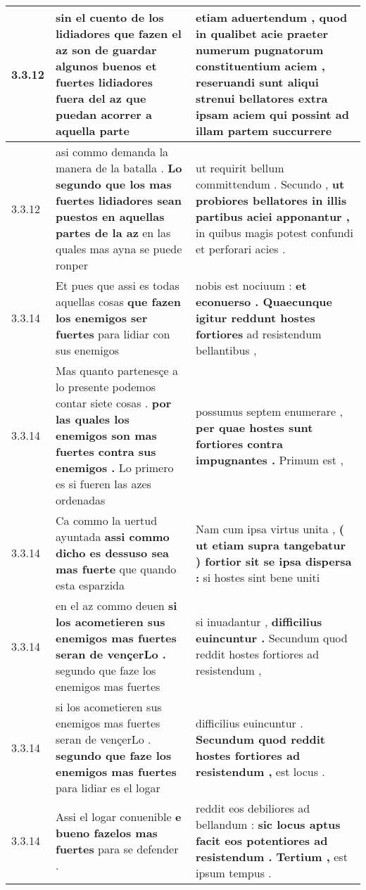 \begin{tabular}{|p{1cm}|p{6.5cm}|p{6.5cm}|}
3.3.12 & sin el cuento de los lidiadores \textbf{ que fazen el az son de guardar algunos buenos et fuertes lidiadores fuera del az } que puedan acorrer a aquella parte & etiam aduertendum , \textbf{ quod in qualibet acie praeter numerum pugnatorum constituentium aciem , reseruandi sunt aliqui strenui bellatores extra ipsam aciem qui possint } ad illam partem succurrere \\\hline
3.3.12 & asi commo demanda la manera de la batalla . \textbf{ Lo segundo que los mas fuertes lidiadores sean puestos en aquellas partes de la az } en las quales mas ayna se puede ronper & ut requirit bellum committendum . Secundo , \textbf{ ut probiores bellatores in illis partibus aciei apponantur , } in quibus magis potest confundi et perforari acies . \\\hline
3.3.14 & Et pues que assi es todas aquellas cosas \textbf{ que fazen los enemigos ser fuertes } para lidiar con sus enemigos & nobis est nociuum : \textbf{ et econuerso . Quaecunque igitur reddunt hostes fortiores } ad resistendum bellantibus , \\\hline
3.3.14 & Mas quanto partenesçe a lo presente podemos contar siete cosas . \textbf{ por las quales los enemigos son mas fuertes contra sus enemigos . } Lo primero es si fueren las azes ordenadas & possumus septem enumerare , \textbf{ per quae hostes sunt fortiores contra impugnantes . } Primum est , \\\hline
3.3.14 & Ca commo la uertud ayuntada \textbf{ assi commo dicho es dessuso sea mas fuerte } que quando esta esparzida & Nam cum ipsa virtus unita , \textbf{ ( ut etiam supra tangebatur ) fortior sit se ipsa dispersa : } si hostes sint bene uniti \\\hline
3.3.14 & en el az commo deuen \textbf{ si los acometieren sus enemigos mas fuertes seran de vençerLo . } segundo que faze los enemigos mas fuertes & si inuadantur , \textbf{ difficilius euincuntur . } Secundum quod reddit hostes fortiores ad resistendum , \\\hline
3.3.14 & si los acometieren sus enemigos mas fuertes seran de vençerLo . \textbf{ segundo que faze los enemigos mas fuertes } para lidiar es el logar & difficilius euincuntur . \textbf{ Secundum quod reddit hostes fortiores ad resistendum , } est locus . \\\hline
3.3.14 & Assi el logar conuenible \textbf{ e bueno fazelos mas fuertes } para se defender . & reddit eos debiliores ad bellandum : \textbf{ sic locus aptus facit eos potentiores ad resistendum . Tertium , } est ipsum tempus . \\\hline

\end{tabular}
